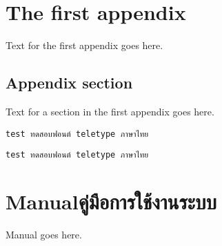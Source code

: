 \chapter{The first appendix}

Text for the first appendix goes here.

\section{Appendix section}

Text for a section in the first appendix goes here.

\ifenglish\else
\verb+test ทดสอบฟอนต์ teletype ภาษาไทย+

\texttt{test ทดสอบฟอนต์ teletype ภาษาไทย}
\fi

\chapter{\ifenglish Manual\else คู่มือการใช้งานระบบ\fi}

Manual goes here.

